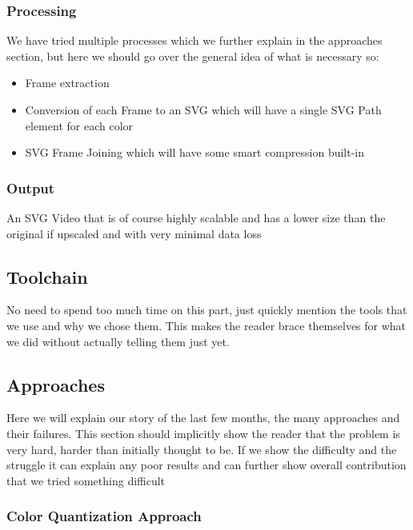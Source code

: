 \documentclass[12pt]{article}
\begin{document}
    \subsubsection{Processing}

    We have tried multiple processes which we further explain in the approaches section, but here
    we should go over the general idea of what is necessary so:
    \begin{itemize}
        \item Frame extraction
        \item Conversion of each Frame to an SVG which will have a single SVG Path element for each color
        \item SVG Frame Joining which will have some smart compression built-in
    \end{itemize}

    \subsubsection{Output}

    An SVG Video that is of course highly scalable and has a lower size than the original if upscaled and with
    very minimal data loss

    \subsection{Toolchain}\label{subsec:toolchain}

    No need to spend too much time on this part, just quickly mention the tools that we use and why we chose them.
    This makes the reader brace themselves for what we did without actually telling them just yet.

    \subsection{Approaches}\label{subsec:approaches}

    Here we will explain our story of the last few months, the many approaches and their failures. This section
    should implicitly show the reader that the problem is very hard, harder than initially thought to be. If
    we show the difficulty and the struggle it can explain any poor results and can further show overall contribution
    that we tried something difficult

    \subsubsection{Color Quantization Approach}
\end{document}
